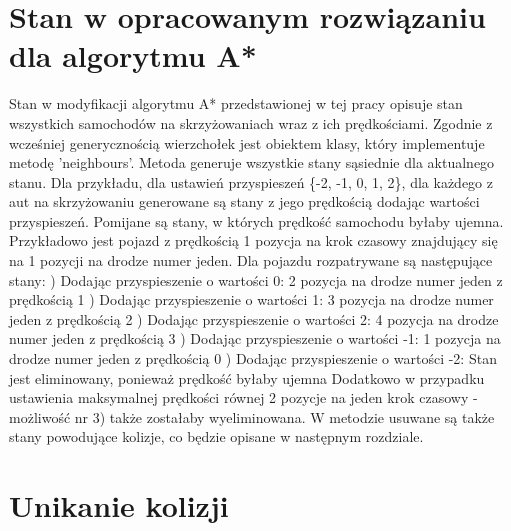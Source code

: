 \section{Stan w opracowanym rozwiązaniu dla algorytmu A*}

Stan w modyfikacji algorytmu A* przedstawionej w tej pracy opisuje stan wszystkich samochodów na skrzyżowaniach wraz z ich prędkościami.
\newline
\newline
Zgodnie z wcześniej generycznością wierzchołek jest obiektem klasy, który implementuje metodę 'neighbours'. Metoda generuje wszystkie stany sąsiednie dla aktualnego stanu. Dla przykładu, dla ustawień przyspieszeń \{-2, -1, 0, 1, 2\}, dla każdego z aut na skrzyżowaniu generowane są stany z jego prędkością dodając wartości przyspieszeń. Pomijane są stany, w których prędkość samochodu byłaby ujemna.
\newline
\newline
Przykładowo jest pojazd z prędkością 1 pozycja na krok czasowy znajdujący się na 1 pozycji na drodze numer jeden. Dla pojazdu rozpatrywane są następujące stany:
) Dodając przyspieszenie o wartości 0: 2 pozycja na drodze numer jeden z prędkością 1
) Dodając przyspieszenie o wartości 1: 3 pozycja na drodze numer jeden z prędkością 2
) Dodając przyspieszenie o wartości 2: 4 pozycja na drodze numer jeden z prędkością 3
) Dodając przyspieszenie o wartości -1: 1 pozycja na drodze numer jeden z prędkością 0
) Dodając przyspieszenie o wartości -2: Stan jest eliminowany, ponieważ prędkość byłaby ujemna
\newline
\newline
Dodatkowo w przypadku ustawienia maksymalnej prędkości równej 2 pozycje na jeden krok czasowy - możliwość nr 3) także zostałaby wyeliminowana.
\newline
\newline
W metodzie usuwane są także stany powodujące kolizje, co będzie opisane w następnym rozdziale.

\section{Unikanie kolizji}


